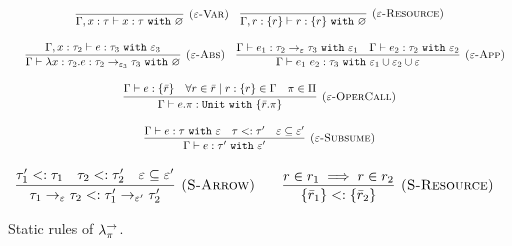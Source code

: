 \begin{figure}[h]


\noindent
{}

\[
\begin{array}{c}

\infer[\textsc{($\varepsilon$-Var)}]
	{ \Gamma, x:\tau \vdash x: \tau~\kw{with} \varnothing }
	{}
	
	~~~
	
\infer[\textsc{($\varepsilon$-Resource)}]
 	{ \Gamma, r: \{ r \} \vdash r : \{ r \}~\kw{with} \varnothing }
 	{} \\[3ex]
 	
 	~~~
	\infer[\textsc{($\varepsilon$-Abs)}]
	{ \Gamma \vdash \lambda x:\tau_2 . e : \tau_2 \rightarrow_{\varepsilon_3} \tau_3~\kw{with} \varnothing }
	{ \Gamma, x: \tau_2 \vdash e: \tau_3~\kw{with} \varepsilon_3 }
	
	~~~
	
\infer[\textsc{($\varepsilon$-App)}]
	{ \Gamma \vdash e_1~e_2 : \tau_3~\kw{with} \varepsilon_1 \cup \varepsilon_2 \cup \varepsilon  }
	{ \Gamma \vdash e_1: \tau_2 \rightarrow_{\varepsilon} \tau_3~\kw{with} \varepsilon_1 & \Gamma \vdash e_2: \tau_2~\kw{with} \varepsilon_2 } \\[3ex]
	
\infer[\textsc{($\varepsilon$-OperCall)}]
	{ \Gamma \vdash e.\pi: \kw{Unit} \kw{with} \{ \bar r.\pi \} }
	{ \Gamma \vdash e: \{ \bar r \} & \forall r \in \bar r \mid r: \{ r \} \in \Gamma & \pi \in \Pi } \\[3ex]

\infer[\textsc{($\varepsilon$-Subsume)}]
	{ \Gamma \vdash e: \tau' ~\kw{with} \varepsilon'}
	{ \Gamma \vdash e: \tau ~\kw{with} \varepsilon & \tau <: \tau' & \varepsilon \subseteq \varepsilon'}
\end{array}
\]


\noindent
{}

\[
\begin{array}{c}

\infer[\textsc{(S-Arrow)}]
	{ \tau_1 \rightarrow_{\varepsilon} \tau_2 <: \tau_1' \rightarrow_{\varepsilon'} \tau_2' }
	{ \tau_1' <: \tau_1 & \tau_2 <: \tau_2' & \varepsilon \subseteq \varepsilon' }
~~~~~~
\infer[\textsc{(S-Resource)}]
	{ \{ \bar r_1 \} <: \{ \bar r_2 \} }
	{ r \in r_1 \implies r \in r_2 }

\end{array}
\]


\vspace{-7pt}
\caption{Static rules of $\lambda^{\rightarrow}_{\pi}$.}
\label{This is the label.}
\end{figure}

